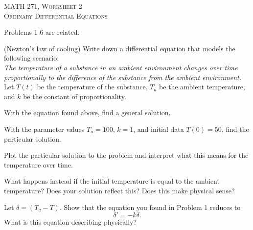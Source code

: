 \documentclass[12pt]{article} %
\begin{document}
\begin{center}
   \textsc{\large MATH 271, Worksheet 2}\\
   \textsc{Ordinary Differential Equations}
\end{center}
\vspace{.5cm}

\begin{center}
    Problems 1-6 are related.
\end{center}

\begin{problem}
    (Newton's law of cooling) Write down a differential equation that models the following scenario:\\
    
    \noindent\emph{The temperature of a substance in an ambient environment changes over time proportionally to the difference of the substance from the ambient environment.}\\
    
    \noindent Let $T(t)$ be the temperature of the substance, $T_a$ be the ambient temperature, and $k$ be the constant of proportionality.
\end{problem}

\begin{problem}
    With the equation found above, find a general solution.
\end{problem}

\begin{problem}
    With the parameter values $T_a=100$, $k=1$, and initial data $T(0)=50$, find the particular solution.
\end{problem}

\begin{problem}
    Plot the particular solution to the problem and interpret what this means for the temperature over time.
\end{problem}

\begin{problem}
    What happens instead if the initial temperature is equal to the ambient temperature? Does your solution reflect this? Does this make physical sense?
\end{problem}

\begin{problem}
    Let $\delta = (T_a-T)$. Show that the equation you found in Problem 1 reduces to
    \[
    \delta' = -k\delta.
    \]
    What is this equation describing physically?
\end{problem}
\end{document}
